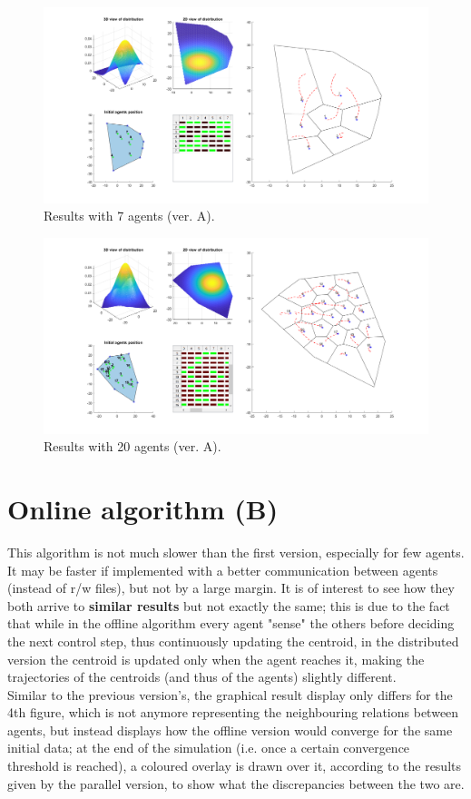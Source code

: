 \documentclass[a4paper,11pt,oneside]{book}
\begin{document}
	
	\begin{figure}	
		\centering	
		\includegraphics[scale=0.45,angle=90]{figs/convergenceResultsA.png}
		\caption{Results with 7 agents (ver. A).}\label{fig:convergenceResultsA.png}	
	\end{figure}
	
	\begin{figure}	
		\centering	
		\includegraphics[scale=0.45, angle=90]{figs/20convergenceResultsA.png}
		\caption{Results with 20 agents (ver. A).}\label{fig:20convergenceResultsA.png}	
	\end{figure}
	
	\section{Online algorithm (B)}
	This algorithm is not much slower than the first version, especially for few agents.
	It may be faster if implemented with a better communication between agents (instead of r/w files), but not by a large margin.
	It is of interest to see how they both arrive to \textbf{similar results} but not exactly the same; this is due to the fact that while in the offline algorithm every agent "sense" the others before deciding the next control step, thus continuously updating the centroid, in the distributed version the centroid is updated only when the agent reaches it, making the trajectories of the centroids (and thus of the agents) slightly different.
	\\
	Similar to the previous version's, the graphical result display only differs for the 4th figure, which is not anymore representing the neighbouring relations between agents, but instead displays how the offline version would converge for the same initial data; at the end of the simulation (i.e. once a certain convergence threshold is reached), a coloured overlay is drawn over it, according to the results given by the parallel version, to show what the discrepancies between the two are.
	
\end{document}
